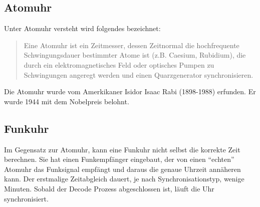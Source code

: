 

\subsection{Atomuhr}
Unter Atomuhr versteht wird folgendes bezeichnet:
\begin{quote}
Eine Atomuhr ist ein Zeitmesser, dessen Zeitnormal die hochfrequente Schwingungsdauer bestimmter Atome ist (z.B. Caesium, Rubidium), die durch ein elektromagnetisches Feld oder optisches Pumpen zu Schwingungen angeregt werden und einen Quarzgenerator synchronisieren.
\end{quote} %
Die Atomuhr wurde vom Amerkikaner Isidor Isaac Rabi (1898-1988) erfunden. Er wurde 1944 mit dem Nobelpreis belohnt.


\subsection{Funkuhr}
Im Gegensatz zur Atomuhr, kann eine Funkuhr nicht selbst die korrekte Zeit berechnen. Sie hat einen Funkempfänger eingebaut, der von einen "`echten"' Atomuhr das Funksignal empfängt und daraus die genaue Uhrzeit annäheren kann. Der erstmalige Zeitabgleich dauert, je nach Synchronisationstyp, wenige Minuten. Sobald der Decode Prozess abgeschlossen ist, läuft die Uhr synchronisiert.

